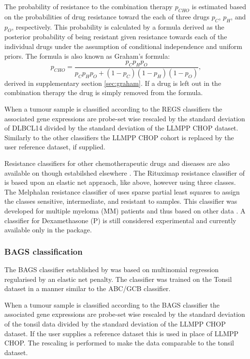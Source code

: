 \documentclass{article}
\begin{document}
The probability of resistance to the combination therapy $p_{CHO}$ is estimated based on the probabilities of drug resistance toward the each of three drugs $p_C$, $p_H$, and $p_O$, respectively.
This probability is calculated by a formula derived as the posterior probability of being resistant given resistance towards each of the individual drugs under the assumption of conditional independence and uniform priors.
The formula is also known as Graham's formula:
\begin{equation*}
  p_{CHO} = \frac{p_C p_H p_O}{p_C p_H p_O + (1 - p_C)(1 - p_H)(1 - p_O)},
\end{equation*}
derived in supplementary section \ref{sec:graham}.
If a drug is left out in the combination therapy the drug is simply removed from the formula.

When a tumour sample is classified according to the REGS classifiers the associated gene expressions are probe-set wise rescaled by the standard deviation of DLBCL14 divided by the standard deviation of the LLMPP CHOP dataset.
Similarly to the other classifiers the LLMPP CHOP cohort is replaced by the user reference dataset, if supplied.

Resistance classifiers for other chemotherapeutic drugs and diseases are also available on \hemaClass{} though estabilshed elsewhere \citep{Boegsted2011,Bogsted2013,Laursen2014}.
The Rituximap resistance classifier of \citet{Laursen2014} is based upon an elastic net appraoch, like above, however using three classes.
The Melphalan resistance classifier of \citet{Boegsted2011} uses sparse partial least squares to assign the classes sensitive, intermediate, and resistant to samples.
This classifier was developed for multiple myeloma (MM) patients and thus based on other data \citep{Boegsted2011}.
A classifier for Dexamethasone (P) is still considered experimental and currently available only in the package.

\subsubsection{BAGS classification}
The BAGS classifier established by \citet{DybkaerBoegsted2015} was based on multinomial regression regularised by an elastic net penalty.
The classifier was trained on the Tonsil dataset in a manner similar to the ABC/GCB classifier.

When a tumour sample is classified according to the BAGS classifier the associated gene expressions are probe-set wise rescaled by the standard deviation of the tonsil data divided by the standard deviation of the LLMPP CHOP dataset.
If the user supplies a reference dataset this is used in place of LLMPP CHOP.
The rescaling is performed to make the data comparable to the tonsil dataset.
\end{document}
